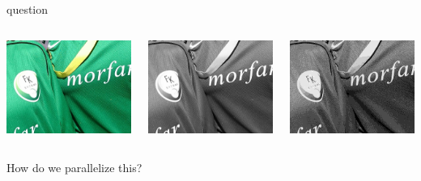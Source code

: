 \begin{frame}{question}

\begin{columns}
 \begin{column}{0.3\linewidth}
   \includegraphics[width=0.8\linewidth]{small.png}
 \end{column}
\pause
 \begin{column}{0.3\linewidth}
   \includegraphics[width=0.8\linewidth]{smallgray.png}
 \end{column}
\pause
 \begin{column}{0.3\linewidth}
   \includegraphics[width=0.8\linewidth]{smallreduced.png}
 \end{column}

\end{columns}

\pause\vspace{20pt}How do we parallelize this?

\end{frame}

